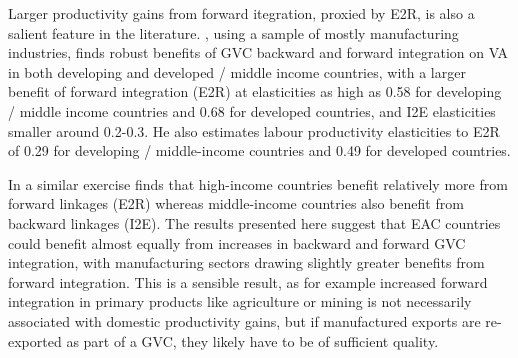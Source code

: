 \documentclass[a4paper]{article}
\begin{document}
Larger productivity gains from forward itegration, proxied by E2R, is also a salient feature in the literature. \citet{Kummritz20161}, using a sample of mostly manufacturing industries, finds robust benefits of GVC backward and forward integration on VA in both developing and developed / middle income countries, with a larger benefit of forward integration (E2R) at elasticities as high as 0.58 for developing / middle income countries and 0.68 for developed countries, and I2E elasticities smaller around 0.2-0.3. He also estimates labour productivity elasticities to E2R of 0.29 for developing / middle-income countries and 0.49 for developed countries. \newline 

In a similar exercise \citet{kummritz2015global} finds that high-income countries benefit relatively more from forward linkages (E2R) whereas middle-income countries also benefit from backward linkages (I2E). The results presented here suggest that EAC countries could benefit almost equally from increases in backward and forward GVC integration, with manufacturing sectors drawing slightly greater benefits from forward integration. 
This is a sensible result, as for example increased forward integration in primary products like agriculture or mining is not necessarily associated with domestic productivity gains, but if manufactured exports are re-exported as part of a GVC, they likely have to be of sufficient quality.  \newpage
\end{document}
